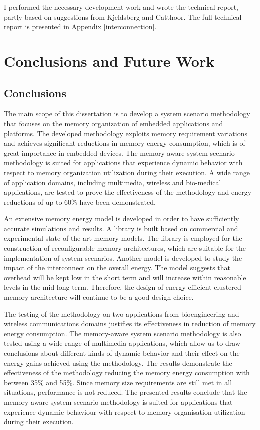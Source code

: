 I performed the necessary development work and wrote the technical report, partly based on suggestions from Kjeldsberg and Catthoor. 
The full technical report is presented in Appendix \ref{interconnection}.

\chapter{Conclusions and Future Work}
\label{conclusions}

\section{Conclusions}

The main scope of this dissertation is to develop a system scenario methodology that focuses on the memory organization of embedded applications and platforms. 
The developed methodology exploits memory requirement variations and achieves significant reductions in memory energy consumption, which is of great importance in embedded devices. 
The memory-aware system scenario methodology is suited for applications that experience dynamic behavior with respect to memory organization utilization during their execution.
A wide range of application domains, including multimedia, wireless and bio-medical applications, are tested to prove the effectiveness of the methodology and energy reductions of up to 60\% have been demonstrated.

An extensive memory energy model is developed in order to have sufficiently accurate simulations and results.
A library is built based on commercial and experimental state-of-the-art memory models.
The library is employed for the construction of reconfigurable memory architectures, which are suitable for the implementation of system scenarios.
Another model is developed to study the impact of the interconnect on the overall energy.
The model suggests that overhead will be kept low in the short term and will increase within reasonable levels in the mid-long term.
Therefore, the design of energy efficient clustered memory architecture will continue to be a good design choice.

The testing of the methodology on two applications from bioengineering and wireless communications domains justifies its effectiveness in reduction of memory energy consumption. 
The memory-aware system scenario methodology is also tested using a wide range of multimedia applications, which allow us to draw conclusions about different kinds of dynamic behavior and their effect on the energy gains achieved using the methodology. 
The results demonstrate the effectiveness of the methodology reducing the memory energy consumption with between 35\% and 55\%. 
Since memory size requirements are still met in all situations, performance is not reduced. 
The presented results conclude that the memory-aware system scenario methodology is suited for applications that experience dynamic behaviour with respect to memory organisation utilization during their execution.



